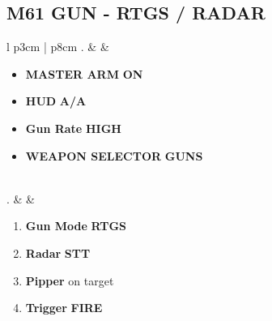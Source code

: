 \documentclass[8pt,usenames,dvipsnames,twoside]{article}
\begin{document}
	\subsection{M61 GUN - RTGS / RADAR}
	\begin{center}
		\begin{tabular}{l p{3cm} | p{8cm}}
			. &  &
			\begin{minipage}[t]{\linewidth}
				\vspace{-7pt}
				\begin{itemize}
					\item \textbf{MASTER ARM} \dotfill \textbf{ON}
					\item \textbf{HUD} \dotfill \textbf{A/A}
					\item \textbf{Gun Rate} \dotfill \textbf{HIGH}
					\item \textbf{WEAPON SELECTOR} \dotfill \textbf{GUNS}
				\end{itemize}
			\end{minipage} \\
			. &  &
			\begin{minipage}[t]{\linewidth}
				\vspace{-7pt}
				\begin{enumerate}
					\item \textbf{Gun Mode} \dotfill \textbf{RTGS}
					\item \textbf{Radar} \dotfill \textbf{STT}
					\item \textbf{Pipper} \dotfill on target
					\item \textbf{Trigger} \dotfill \textbf{FIRE}
				\end{enumerate}
			\end{minipage} \\
			\bottomrule
		\end{tabular}
	\end{center}

	\clearpage
\end{document}
